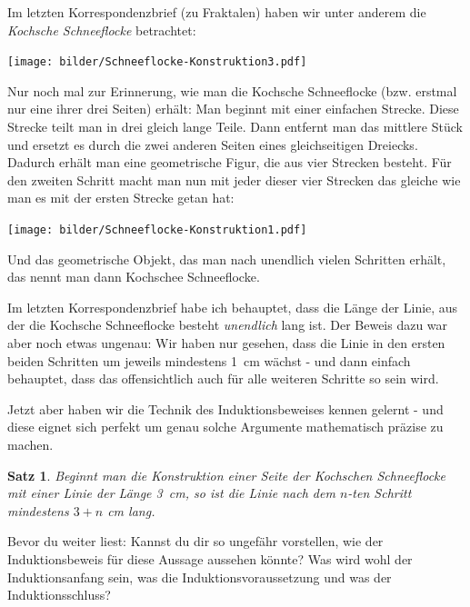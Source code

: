 \documentclass[a4paper,ngerman,12pt]{scrartcl}
\theoremstyle{definition}
\theoremstyle{plain}
\newtheorem{satz}[defn]{Satz}
\theoremstyle{remark}
\begin{document}
Im letzten Korrespondenzbrief (zu Fraktalen) haben wir unter anderem die \emph{Kochsche Schneeflocke} betrachtet:
\begin{center}
	\texttt{[image: bilder/Schneeflocke-Konstruktion3.pdf]}
\end{center}
Nur noch mal zur Erinnerung, wie man die Kochsche Schneeflocke (bzw. erstmal nur eine ihrer drei Seiten) erhält: Man beginnt mit einer einfachen Strecke. Diese Strecke teilt man in drei gleich lange Teile. Dann entfernt man das mittlere Stück und ersetzt es durch die zwei anderen Seiten eines gleichseitigen Dreiecks. Dadurch erhält man eine geometrische Figur, die aus vier Strecken besteht. Für den zweiten Schritt macht man nun mit jeder dieser vier Strecken das gleiche wie man es mit der ersten Strecke getan hat:
\begin{center}
	\texttt{[image: bilder/Schneeflocke-Konstruktion1.pdf]}
\end{center}
Und das geometrische Objekt, das man \glqq nach unendlich vielen Schritten\grqq{} erhält, das nennt man dann Kochschee Schneeflocke.

Im letzten Korrespondenzbrief habe ich behauptet, dass die Länge der Linie, aus der die Kochsche Schneeflocke besteht \emph{unendlich} lang ist. Der Beweis dazu war aber noch etwas ungenau: Wir haben nur gesehen, dass die Linie in den ersten beiden Schritten um jeweils mindestens \SI{1}{\cm} wächst - und dann einfach behauptet, dass das \glqq offensichtlich\grqq{} auch für alle weiteren Schritte so sein wird.

Jetzt aber haben wir die Technik des Induktionsbeweises kennen gelernt - und diese eignet sich perfekt um genau solche Argumente mathematisch präzise zu machen. 

\begin{satz}
	Beginnt man die Konstruktion einer Seite der Kochschen Schneeflocke mit einer Linie der Länge \SI{3}{\cm}, so ist die Linie nach dem $n$-ten Schritt mindestens $3+n$ \si{\cm} lang.
\end{satz}

Bevor du weiter liest: Kannst du dir so ungefähr vorstellen, wie der Induktionsbeweis für diese Aussage aussehen könnte? Was wird wohl der Induktionsanfang sein, was die Induktionsvoraussetzung und was der Induktionsschluss?
\end{document}
